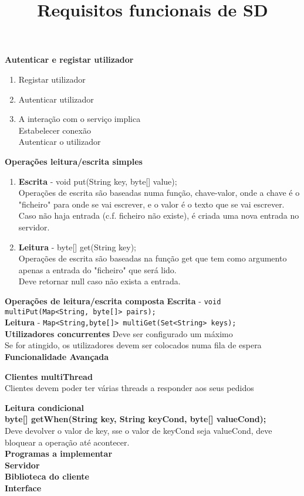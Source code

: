 \documentclass{article}[12pt]
\title{\textbf{\Large{Requisitos funcionais de SD}}}
\begin{document}
	\maketitle
	\pagebreak
	\textbf{Autenticar e registar utilizador}
	\begin{enumerate}
		\item Registar utilizador 
		\item Autenticar utilizador
		\item A interação com o serviço implica\\
			Estabelecer conexão\\
			Autenticar o utilizador
		
	\end{enumerate}
	
	\textbf{Operações leitura/escrita simples}
	\begin{enumerate}
		\item \textbf{Escrita} - void put(String key, byte[] value);\\
				Operações de escrita são baseadas numa função, chave-valor, onde a chave é o "ficheiro" para onde se vai escrever, e o valor é o texto que se vai escrever.\\
				Caso não haja entrada (c.f. ficheiro não existe), é criada uma nova entrada no servidor.
		\item \textbf{Leitura} - byte[] get(String key);\\
				Operações de escrita são baseadas na função get que tem como argumento apenas a entrada do "ficheiro" que será lido.\\
				Deve retornar null caso não exista a entrada.
	\end{enumerate}
	
	\textbf{Operações de leitura/escrita composta}
	\textbf{Escrita} - \texttt{void multiPut(Map<String, byte[]> pairs);}\\
	\textbf{Leitura} - \texttt{Map<String,byte[]> multiGet(Set<String> keys);}\\
	
	
	\textbf{Utilizadores concurrentes}
	Deve ser configurado um máximo\\
	Se for atingido, os utilizadores devem ser colocados numa fila de espera\\

	
	
	\textbf{\Large{Funcionalidade Avançada}}
	
	\textbf{Clientes multiThread}\\
	Clientes devem poder ter várias threads a responder aos seus pedidos

	\textbf{Leitura condicional}\\
	\textbf{byte[] getWhen(String key, String keyCond, byte[] valueCond);}\\
	Deve devolver o valor de key, sse o valor de keyCond seja valueCond, deve bloquear a operação até acontecer.\\


	\textbf{Programas a implementar}\\
	\textbf{Servidor}\\
	\textbf{Biblioteca do cliente}\\
	\textbf{Interface}\\
	
\end{document}
